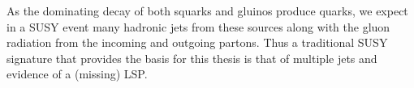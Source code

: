 As the dominating decay of both squarks and gluinos produce quarks, we expect in a SUSY event many hadronic jets from these sources along with the gluon radiation from the incoming and outgoing partons. Thus a traditional SUSY signature that provides the basis for this thesis is that of multiple jets and evidence of a (missing) LSP. 



